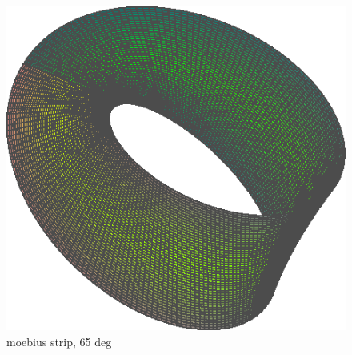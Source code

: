 \documentclass[a5paper]{article}
\begin{document}
\begin{figure}[h]
  \centering
  \includegraphics{moebius-65deg.eps}
  \caption{moebius strip, 65 deg}
  \label{fig:moebius-65deg}
\end{figure}
\end{document}
